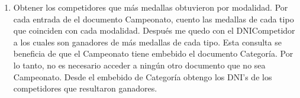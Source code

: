 \begin{enumerate}
\item Obtener los competidores que más medallas obtuvieron por modalidad. Por cada entrada de el documento Campeonato,
cuento las medallas de cada tipo que coinciden con cada modalidad. Después me quedo con el DNICompetidor a los cuales
son ganadores de más medallas de cada tipo. Esta consulta se beneficia de que el Campeonato tiene embebido
el documento Categoría. Por lo tanto, no es necesario acceder a ningún otro documento que no sea Campeonato. Desde el embebido
 de Categoría obtengo los DNI's de los competidores que resultaron ganadores.

\end{enumerate}
